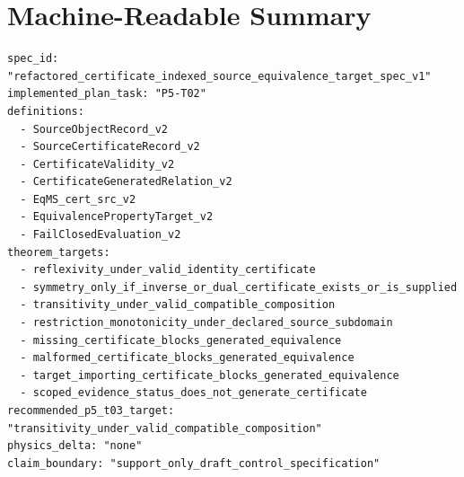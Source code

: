 \documentclass[11pt]{article}
\begin{document}
\section{Machine-Readable Summary}

\begin{verbatim}
spec_id: "refactored_certificate_indexed_source_equivalence_target_spec_v1"
implemented_plan_task: "P5-T02"
definitions:
  - SourceObjectRecord_v2
  - SourceCertificateRecord_v2
  - CertificateValidity_v2
  - CertificateGeneratedRelation_v2
  - EqMS_cert_src_v2
  - EquivalencePropertyTarget_v2
  - FailClosedEvaluation_v2
theorem_targets:
  - reflexivity_under_valid_identity_certificate
  - symmetry_only_if_inverse_or_dual_certificate_exists_or_is_supplied
  - transitivity_under_valid_compatible_composition
  - restriction_monotonicity_under_declared_source_subdomain
  - missing_certificate_blocks_generated_equivalence
  - malformed_certificate_blocks_generated_equivalence
  - target_importing_certificate_blocks_generated_equivalence
  - scoped_evidence_status_does_not_generate_certificate
recommended_p5_t03_target: "transitivity_under_valid_compatible_composition"
physics_delta: "none"
claim_boundary: "support_only_draft_control_specification"
\end{verbatim}
\end{document}
